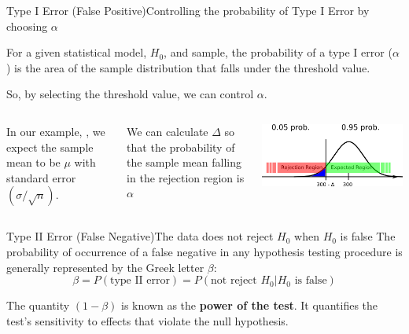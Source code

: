 \begin{frame}{Type I Error (False Positive)}{Controlling the probability of Type I Error by choosing $\alpha$}

  For a given statistical model, $H_0$, and sample, the probability of a type I error ($\alpha$) is the area of the sample distribution that falls under the threshold value.\medskip

  So, by selecting the threshold value, we can control $\alpha$.\bigskip

  \begin{columns}[T]
    In our example, ,
    we expect the sample mean to be $\mu$ with standard error $(\sigma / \sqrt{n})$.\bigskip

    We can calculate $\Delta$ so that the probability of
    the sample mean falling in the rejection region is $\alpha$

    \includegraphics[width=\textwidth]{../img/critical_region_alpha}
  \end{columns}
\end{frame}

\begin{frame}{Type II Error (False Negative)}{The data does not reject $H_0$ when $H_0$ is false}
  The probability of occurrence of a false negative in any hypothesis testing procedure is generally represented by the Greek letter $\beta$:
  \begin{equation*}
    \beta = P(\text{type II error}) = P(\text{not reject }H_0|H_0\text{ is false})
  \end{equation*}\bigskip

  The quantity $(1 - \beta)$ is known as the {\bf power of the test}. It quantifies the test's sensitivity to effects that violate the null hypothesis.
\end{frame}

